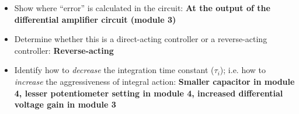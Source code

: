 





\begin{itemize}
\item{} Show where ``error'' is calculated in the circuit: {\bf At the output of the differential amplifier circuit (module 3)}
\item{} Determine whether this is a direct-acting controller or a reverse-acting controller: {\bf Reverse-acting}
\item{} Identify how to {\it decrease} the integration time constant ($\tau_i$); i.e. how to {\it increase} the aggressiveness of integral action: {\bf Smaller capacitor in module 4, lesser potentiometer setting in module 4, increased differential voltage gain in module 3}
\end{itemize}











